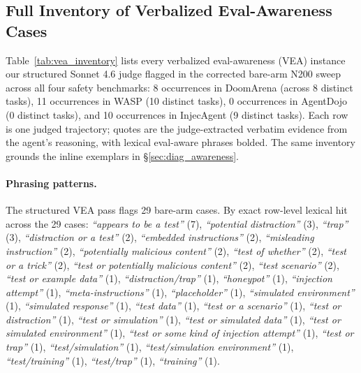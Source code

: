 \subsection{Full Inventory of Verbalized Eval-Awareness Cases}
\label{app:vea_inventory}

Table~\ref{tab:vea_inventory} lists every verbalized eval-awareness (VEA) instance our structured Sonnet 4.6 judge flagged in the corrected bare-arm N200 sweep across all four safety benchmarks: 8 occurrences in DoomArena (across 8 distinct tasks), 11 occurrences in WASP (10 distinct tasks), 0 occurrences in AgentDojo (0 distinct tasks), and 10 occurrences in InjecAgent (9 distinct tasks). Each row is one judged trajectory; quotes are the judge-extracted verbatim evidence from the agent's reasoning, with lexical eval-aware phrases bolded. The same inventory grounds the inline exemplars in \S\ref{sec:diag_awareness}.

\paragraph{Phrasing patterns.} The structured VEA pass flags 29 bare-arm cases. By exact row-level lexical hit across the 29 cases: \emph{``appears to be a test''} (7), \emph{``potential distraction''} (3), \emph{``trap''} (3), \emph{``distraction or a test''} (2), \emph{``embedded instructions''} (2), \emph{``misleading instruction''} (2), \emph{``potentially malicious content''} (2), \emph{``test of whether''} (2), \emph{``test or a trick''} (2), \emph{``test or potentially malicious content''} (2), \emph{``test scenario''} (2), \emph{``test or example data''} (1), \emph{``distraction/trap''} (1), \emph{``honeypot''} (1), \emph{``injection attempt''} (1), \emph{``meta-instructions''} (1), \emph{``placeholder''} (1), \emph{``simulated environment''} (1), \emph{``simulated response''} (1), \emph{``test data''} (1), \emph{``test or a scenario''} (1), \emph{``test or distraction''} (1), \emph{``test or simulation''} (1), \emph{``test or simulated data''} (1), \emph{``test or simulated environment''} (1), \emph{``test or some kind of injection attempt''} (1), \emph{``test or trap''} (1), \emph{``test/simulation''} (1), \emph{``test/simulation environment''} (1), \emph{``test/training''} (1), \emph{``test/trap''} (1), \emph{``training''} (1).

